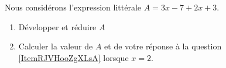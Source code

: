 
\begin{exercice}\label{exo2smath-0276}

    Nous considérons l'expression littérale \( A=3x-7+2x+3\).
    \begin{enumerate}
        \item   \label{ItemRJVHooZgXLsA}
            Développer et réduire \( A\)
        \item
            Calculer la valeur de \( A\) et de votre réponse à la question \ref{ItemRJVHooZgXLsA} lorsque \( x=2\).
    \end{enumerate}

\end{exercice}
